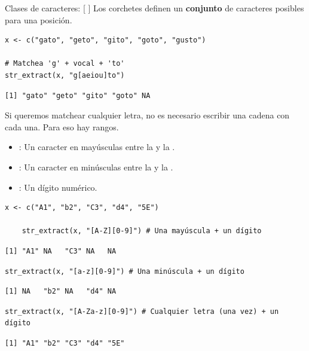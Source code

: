 \documentclass[8pt]{beamer}
\begin{document}
\begin{frame}[fragile]{Clases de caracteres: [ ]}
	Los corchetes definen un \textbf{conjunto} de caracteres posibles para una posición.
	
\begin{lstlisting}[style=RScript]
x <- c("gato", "geto", "gito", "goto", "gusto")

# Matchea 'g' + vocal + 'to'
str_extract(x, "g[aeiou]to")
\end{lstlisting}
\begin{lstlisting}[style=RConsole]
[1] "gato" "geto" "gito" "goto" NA
\end{lstlisting}

	Si queremos matchear cualquier letra, no es necesario escribir una cadena con cada una. Para eso hay rangos. 
	
	\begin{itemize}
		\item {}: Un caracter en may\'usculas entre la  y la . 
		\item {}: Un caracter en min\'usculas entre la  y la . 
		\item {}: Un d\'igito num\'erico. 
	\end{itemize}
\end{frame}



\begin{frame}[fragile]
\begin{lstlisting}[style=RScript]
	x <- c("A1", "b2", "C3", "d4", "5E")
	
	str_extract(x, "[A-Z][0-9]") # Una mayúscula + un dígito
\end{lstlisting}
\begin{lstlisting}[style=RConsole]
	[1] "A1" NA   "C3" NA   NA
\end{lstlisting}
\begin{lstlisting}[style=RScript]
	str_extract(x, "[a-z][0-9]") # Una minúscula + un dígito
\end{lstlisting}
\begin{lstlisting}[style=RConsole]
	[1] NA   "b2" NA   "d4" NA
\end{lstlisting}
\begin{lstlisting}[style=RScript]
	str_extract(x, "[A-Za-z][0-9]") # Cualquier letra (una vez) + un dígito
\end{lstlisting}
\begin{lstlisting}[style=RConsole]
	[1] "A1" "b2" "C3" "d4" "5E"
\end{lstlisting}
\end{frame}
\end{document}
